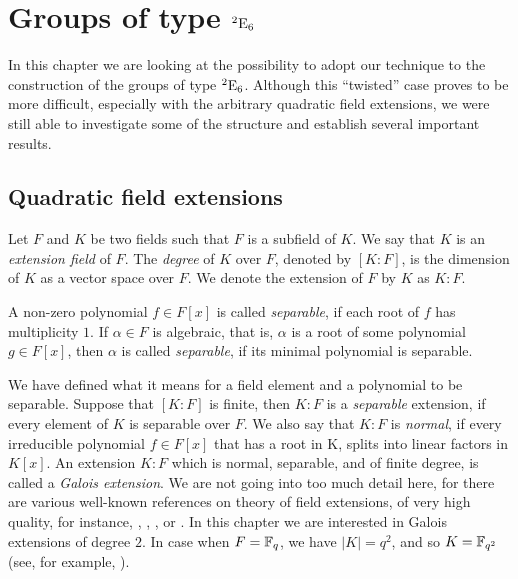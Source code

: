 \chapter{Groups of type ${}^2\mathord{\mathrm{E}}_6$}
\ifpdf
    \graphicspath{{Chapter3/Chapter3Figs/PNG/}{Chapter3/Chapter3Figs/PDF/}{Chapter3/Chapter3Figs/}}
\else
    \graphicspath{{Chapter3/Chapter3Figs/EPS/}{Chapter3/Chapter3Figs/}}
\fi

In this chapter we are looking at the 
possibility to adopt our technique to the
construction of the groups of type
${}^2\mathrm{E}_6$. Although this ``twisted'' case
proves to be more difficult, especially
with the arbitrary quadratic field extensions,
we were still able to investigate some of the
structure and establish several important 
results. 

\section{Quadratic field extensions}

Let $F$ and $K$ be two fields such that $F$ is a subfield of $K$. We say that 
$K$ is an \textit{extension field} of $F$. The \textit{degree} of $K$ over $F$, 
denoted by $[K:F]$, is the dimension of $K$ as a vector space over $F$. We denote the
extension of $F$ by $K$ as $K : F$.

A non-zero polynomial $f \in F[x]$ is called \textit{separable}, if each root of $f$ has 
multiplicity $1$. If $\alpha \in F$ is algebraic, that is, $\alpha$ is a root of some polynomial
$g \in F[x]$, then $\alpha$ is called \textit{separable}, if its minimal polynomial is separable. 

We have defined what it means for a field element and a polynomial to be separable. Suppose that
$[K:F]$ is finite, then $K : F$ is a \textit{separable} extension, if every element of $K$ is 
separable over $F$. We also say that $K : F$ is \textit{normal}, if every irreducible 
polynomial $f \in F[x]$ that has a root in K, splits into linear factors in $K[x]$. An extension
$K : F$ which is normal, separable, and of finite degree, is called a \textit{Galois extension}.
We are not going into too much detail here, for there are various  well-known references on theory
of field extensions, of very high quality, for instance, \cite{PeterCameron}, \cite{DummitFoote}, \cite{Lang}, or \cite{Stewart}. In this chapter
we are interested in Galois extensions of degree $2$. 
In case when $F = \mathbb{F}_q$, we have $|K| = q^2$, and so $K = \mathbb{F}_{q^2}$ (see, for example, \cite{Moore}).

